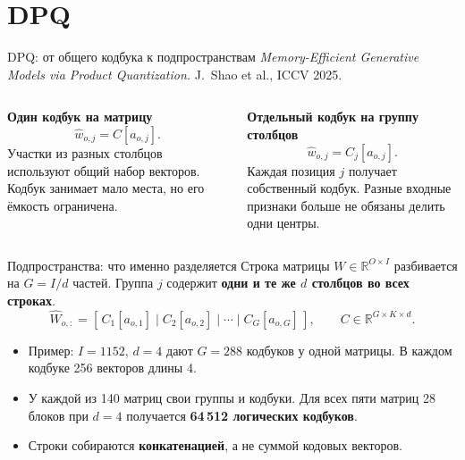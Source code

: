 \documentclass[aspectratio=169,10pt]{beamer}
\newcommand{\takeaway}[1]{\par\vspace{1.5mm}{\bfseries #1\par}}
\newcommand{\tights}{\setlength{\itemsep}{1.4mm}\setlength{\parsep}{0pt}\setlength{\parskip}{0pt}}
\begin{document}
\section{DPQ}

\begin{frame}[t]{DPQ: от общего кодбука к подпространствам}
  \textit{Memory-Efficient Generative Models via Product Quantization.}
  J.~Shao et al., ICCV 2025.

  \begin{columns}[T,onlytextwidth]
    \begin{column}{.47\textwidth}
      \textbf{Один кодбук на матрицу}
      \[
        \widehat w_{o,j}=C[a_{o,j}].
      \]
      Участки из разных столбцов используют общий набор векторов.
      Кодбук занимает мало места, но его ёмкость ограничена.
    \end{column}
    \begin{column}{.50\textwidth}
      \textbf{Отдельный кодбук на группу столбцов}
      \[
        \widehat w_{o,j}=C_j[a_{o,j}].
      \]
      Каждая позиция $j$ получает собственный кодбук.
      Разные входные признаки больше не обязаны делить одни центры.
    \end{column}
  \end{columns}
  \vspace{3mm}
  \takeaway{Идея DPQ: сначала увеличить выразительность представления,\par
  затем сжать сами кодбуки и откалибровать модель.}
\end{frame}

\begin{frame}[t]{Подпространства: что именно разделяется}
  Строка матрицы $W\in\mathbb R^{O\times I}$ разбивается на $G=I/d$ частей.
  Группа $j$ содержит \textbf{одни и те же $d$ столбцов во всех строках}.
  \[
    \widehat W_{o,:}=
      [\,C_1[a_{o,1}]\mid C_2[a_{o,2}]\mid\cdots\mid C_G[a_{o,G}]\,],
    \qquad C\in\mathbb R^{G\times K\times d}.
  \]
  \begin{itemize}\tights
    \item Пример: $I=1152$, $d=4$ дают $G=288$ кодбуков у одной матрицы.
    В каждом кодбуке 256 векторов длины 4.
    \item У каждой из 140 матриц свои группы и кодбуки.
    Для всех пяти матриц 28 блоков при $d=4$ получается \textbf{64\,512 логических кодбуков}.
    \item Строки собираются \textbf{конкатенацией}, а не суммой кодовых векторов.
  \end{itemize}
  \takeaway{Из $K$ вариантов на каждую из $G$ частей получается до $K^G$\par
  разных строк. Хранить все эти строки целиком не требуется.}
\end{frame}
\end{document}
